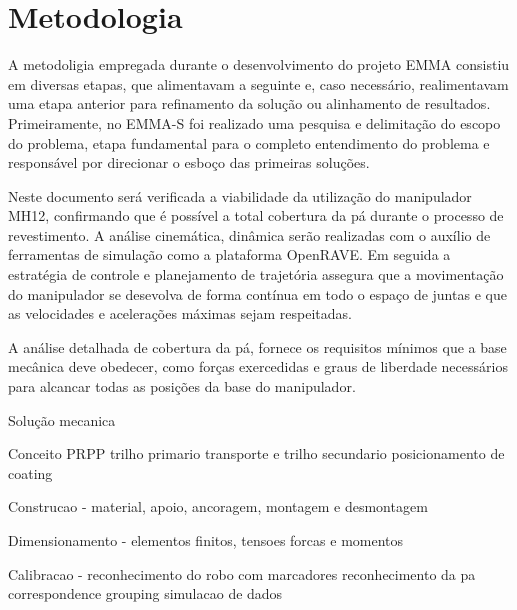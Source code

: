 \section{Metodologia}


A metodoligia empregada durante o desenvolvimento do projeto EMMA consistiu em
diversas etapas, que alimentavam a seguinte e, caso necessário,
realimentavam uma etapa anterior para refinamento da solução ou alinhamento de
resultados. Primeiramente, no EMMA-S foi realizado uma pesquisa e delimitação do
escopo do problema, etapa fundamental para o completo entendimento do problema e
responsável por direcionar o esboço das primeiras soluções. 

Neste documento será verificada a viabilidade da utilização do manipulador MH12,
confirmando que é possível a total cobertura da pá durante o processo de
revestimento. A análise cinemática, dinâmica serão realizadas com o auxílio de
ferramentas de simulação como a plataforma OpenRAVE. Em seguida a estratégia de
controle e planejamento de trajetória assegura que a movimentação do manipulador
se desevolva de forma contínua em todo o espaço de juntas e que as velocidades e
acelerações máximas sejam respeitadas.

A análise detalhada de cobertura da pá, fornece os requisitos mínimos que a base
mecânica deve obedecer, como forças exercedidas e graus de liberdade necessários
para alcancar todas as posições da base do manipulador. 





Solução mecanica

Conceito PRPP trilho primario transporte e trilho secundario posicionamento de
coating

Construcao - material, apoio, ancoragem, montagem e desmontagem

Dimensionamento - elementos finitos, tensoes forcas e momentos

Calibracao - reconhecimento do robo com marcadores
reconhecimento da pa correspondence grouping
simulacao de dados 

